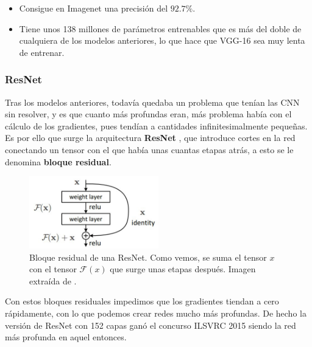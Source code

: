             \begin{itemize}
                \item Consigue en Imagenet una precisión del $92.7 \%$.
                \item Tiene unos 138 millones de parámetros entrenables que es más del doble de cualquiera de los modelos anteriores, lo que hace que VGG-16 sea muy lenta de entrenar.
            \end{itemize}

        \subsubsection{ResNet}

            \noindent Tras los modelos anteriores, todavía quedaba un problema que tenían las CNN sin resolver, y es que cuanto más profundas eran, más problema había con el cálculo de los gradientes, pues tendían a cantidades infinitesimalmente pequeñas. Es por ello que surge la arquitectura \textbf{ResNet} \cite{he2016deep}, que introduce cortes en la red conectando un tensor con el que había unas cuantas etapas atrás, a esto se le denomina \textbf{bloque residual}. 

            \begin{figure}[!h]
                \centering
                \includegraphics[width=0.5\textwidth]{img/resnet_module.jpeg}
                \caption{Bloque residual de una ResNet. Como vemos, se suma el tensor $x$ con el tensor $\mathcal{F}(x)$ que surge unas etapas después. Imagen extraída de \cite{he2016deep}.}
                \label{fig:Resnet}
            \end{figure}
            
            \noindent Con estos bloques residuales impedimos que los gradientes tiendan a cero rápidamente, con lo que podemos crear redes mucho más profundas. De hecho la versión de ResNet con 152 capas ganó el concurso ILSVRC 2015 siendo la red más profunda en aquel entonces. 


